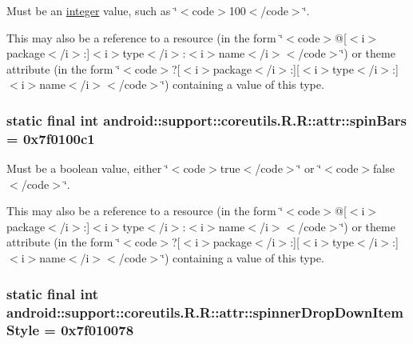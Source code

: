 Must be an \hyperlink{classandroid_1_1support_1_1coreutils_1_1_r_1_1integer}{integer} value, such as \char`\"{}$<$code$>$100$<$/code$>$\char`\"{}. 

This may also be a reference to a resource (in the form \char`\"{}$<$code$>$@\mbox{[}$<$i$>$package$<$/i$>$:\mbox{]}$<$i$>$type$<$/i$>$:$<$i$>$name$<$/i$>$$<$/code$>$\char`\"{}) or theme attribute (in the form \char`\"{}$<$code$>$?\mbox{[}$<$i$>$package$<$/i$>$:\mbox{]}\mbox{[}$<$i$>$type$<$/i$>$:\mbox{]}$<$i$>$name$<$/i$>$$<$/code$>$\char`\"{}) containing a value of this type. \hypertarget{classandroid_1_1support_1_1coreutils_1_1_r_1_1attr_1c04ac3917b9d0cd52af3541bfcf5265}{
\subsubsection[{spinBars}]{\setlength{\rightskip}{0pt plus 5cm}static final int android::support::coreutils.R.R::attr::spinBars = 0x7f0100c1}}
\label{classandroid_1_1support_1_1coreutils_1_1_r_1_1attr_1c04ac3917b9d0cd52af3541bfcf5265}


Must be a boolean value, either \char`\"{}$<$code$>$true$<$/code$>$\char`\"{} or \char`\"{}$<$code$>$false$<$/code$>$\char`\"{}. 

This may also be a reference to a resource (in the form \char`\"{}$<$code$>$@\mbox{[}$<$i$>$package$<$/i$>$:\mbox{]}$<$i$>$type$<$/i$>$:$<$i$>$name$<$/i$>$$<$/code$>$\char`\"{}) or theme attribute (in the form \char`\"{}$<$code$>$?\mbox{[}$<$i$>$package$<$/i$>$:\mbox{]}\mbox{[}$<$i$>$type$<$/i$>$:\mbox{]}$<$i$>$name$<$/i$>$$<$/code$>$\char`\"{}) containing a value of this type. \hypertarget{classandroid_1_1support_1_1coreutils_1_1_r_1_1attr_762705f0f52f81ed54d6bef82373e5ed}{
\subsubsection[{spinnerDropDownItemStyle}]{\setlength{\rightskip}{0pt plus 5cm}static final int android::support::coreutils.R.R::attr::spinnerDropDownItemStyle = 0x7f010078}}
\label{classandroid_1_1support_1_1coreutils_1_1_r_1_1attr_762705f0f52f81ed54d6bef82373e5ed}


